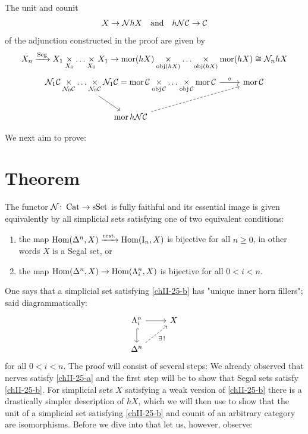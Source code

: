         The unit and counit
        \begin{equation*}
            X \to \mathcal{N} hX \quad \text{and} \quad h\mathcal{N}\mathcal{C} \to \mathcal{C}
        \end{equation*}
        of the adjunction constructed in the proof are given by
        \begin{equation*}
            X_n \xrightarrow{\operatorname{Seg}} X_1 \underset{X_0}{\times} \ldots \underset{X_0}{\times} X_1 \rightarrow \operatorname{mor}(hX) \underset{\operatorname{obj}(hX)}{\times} \ldots \underset{\operatorname{obj}(hX)}{\times} \operatorname{mor}(hX) \cong \mathcal{N}_n hX
        \end{equation*}
        \begin{equation*}
            \begin{tikzcd}
                \longpb{\Nn_1 \Cc}{\Nn_0 \Cc} = \longpb{\mor{\Cc}}{\obj{\Cc}} \arrow[d, start anchor={[xshift=-9ex]south}, end anchor={[xshift=-3ex]north}] \arrow[r, "\circ"] & \mor{\Cc} \\
                \mor{h \Nn \Cc} \arrow[ur, dashed]
            \end{tikzcd}           
        \end{equation*}

        We next aim to prove:
        \section{Theorem}\label{chII-25}
            The functor $\mathcal{N} \colon \operatorname{Cat} \to \operatorname{sSet}$ is fully faithful and its essential image is given equivalently by all simplicial sets satisfying one of two equivalent conditions:
            \begin{enumerate}[label=\alph*)]
                \item 
                    the map $\operatorname{Hom}(\Delta^n, X) \xrightarrow{\text{rest.}} \operatorname{Hom}(\mathrm{I}_n, X)$ is bijective for all $n \geq 0$, in other words $X$ is a Segal set, or\label{chII-25-a}
                \item 
                    the map $\operatorname{Hom}(\Delta^n, X) \rightarrow \operatorname{Hom}(\Lambda^{n}_{i}, X)$ is bijective  for all $0 < i < n$.\label{chII-25-b}
            \end{enumerate}

            One says that a simplicial set satisfying \ref{chII-25-b} has "unique inner horn fillers"; said diagrammatically:
            \begin{equation*}
                \begin{tikzcd}
                    \horn{n}{i} \arrow[r] \arrow[d, hook]          & X \\
                    \Delta^n \arrow[ru, "{\exists \, !}"', dashed] &  
                \end{tikzcd}
            \end{equation*}
            for all $0 < i < n$. The proof will consist of several steps: We already observed that nerves satisfy \ref{chII-25-a} and the first step will be to show that Segal sets satisfy \ref{chII-25-b}. For simplicial sets $X$ satisfying a weak version of \ref{chII-25-b} there is a drastically simpler description of $hX$, which we will then use to show that the unit of a simplicial set satisfying \ref{chII-25-b} and counit of an arbitrary category are isomorphisms. Before we dive into that let us, however, observe:

